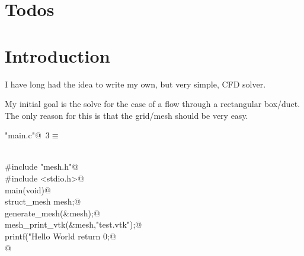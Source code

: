 \documentclass[a4paper,11pt]{article}
\title{\programname}
\author{Simon Lee}
\date{\today}
\begin{document}
\maketitle
\newpage

\tableofcontents
\newpage

\section{Todos}
\listoftodos
\section{Introduction}

I have long had the idea to write my own, but very simple, CFD solver.

My initial goal is the solve for the case of a flow through a rectangular box/duct. The only reason for this is that the grid/mesh should be very easy.


\begin{flushleft} \small
\begin{minipage}{\linewidth}\label{scrap1}\raggedright\small
{} \verb@"main.c"@\nobreak\ {\footnotesize {3}}$\equiv$
\vspace{-1ex}
\begin{list}{}{} \item
\mbox{}\verb@@\\
\mbox{}\verb@#include "mesh.h"@\\
\mbox{}\verb@#include <stdio.h>@\\
\mbox{}\verb@int main(void){@\\
\mbox{}\verb@    struct_mesh mesh;@\\
\mbox{}\verb@    generate_mesh(&mesh);@\\
\mbox{}\verb@    mesh_print_vtk(&mesh,"test.vtk");@\\
\mbox{}\verb@    printf("Hello World %d %d\n",mesh.num_points, mesh.num_cells);@\\
\mbox{}\verb@    return 0;@\\
\mbox{}\verb@}@\\
\mbox{}\verb@@{\NWsep}
\end{list}
\vspace{-1.5ex}
\footnotesize
\begin{list}{}{\setlength{\itemsep}{-\parsep}\setlength{\itemindent}{-\leftmargin}}

\item{}
\end{list}
\end{minipage}\vspace{4ex}
\end{flushleft}
\newpage
\end{document}
